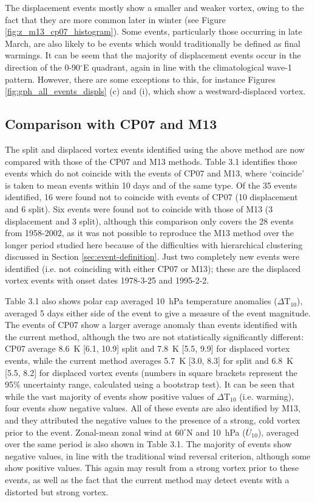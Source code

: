 The displacement events mostly show a smaller and weaker vortex, owing to the
fact that they are more common later in winter (see Figure
\ref{fig:z_m13_cp07_histogram}). Some events, particularly those occurring in
late March, are also likely to be events which would traditionally be defined as
final warmings. It can be seem that the majority of displacement events occur in
the direction of the 0-90$^{\circ}$E quadrant, again in line with the
climatological wave-1 pattern. However, there are some exceptions to this, for
instance Figures \ref{fig:gph_all_events_displs} (c) and (i), which  show a
westward-displaced vortex. 



\subsection{Comparison with CP07 and M13}

The split and displaced vortex events identified using the above method are now
compared with those of the CP07 and M13 methods. Table 3.1 identifies those
events which do not coincide with the events of CP07 and M13, where `coincide'
is taken to mean events within 10 days and of the same type. Of the 35 events
identified, 16 were found not to coincide with events of CP07 (10 displacement
and 6 split). Six events were found not to coincide with those of M13 (3
displacement and 3 split), although this comparison only covers the 28 events
from 1958-2002, as it was not possible to reproduce the M13 method over the
longer period studied here because of the difficulties with hierarchical
clustering discussed in Section \ref{sec:event-definition}. Just two completely
new events were identified (i.e. not coinciding with either CP07 or M13); these
are the displaced vortex events with onset dates 1978-3-25 and 1995-2-2.

Table 3.1 also shows polar cap averaged 10~hPa temperature anomalies
($\Delta \mathrm{T}_{10}$), averaged 5 days either side of the event to give a
measure of the event magnitude. The events of CP07 show a larger average anomaly
than events identified with the current method, although the two are not
statistically significantly different: CP07 average 8.6~K [6.1, 10.9] split and
7.8~K [5.5, 9.9] for displaced vortex events, while the current method averages
5.7~K [3.0, 8.3] for split and 6.8~K [5.5, 8.2] for displaced vortex events
(numbers in square brackets represent the 95\% uncertainty range, calculated
using a bootstrap test). It can be seen that while the vast majority of events
show positive values of $\Delta \mathrm{T}_{10}$ (i.e. warming), four events
show negative values. All of these events are also identified by M13, and they
attributed the negative values to the presence of a strong, cold vortex prior to
the event. Zonal-mean zonal wind at $60^{\circ}$N and 10~hPa
($\overline{U}_{10}$), averaged over the same period is also shown in Table
3.1. The majority of events show negative values, in line with the traditional
wind reversal criterion, although some show positive values. This again may
result from a strong vortex prior to these events, as well as the fact that the
current method may detect events with a distorted but strong vortex.

